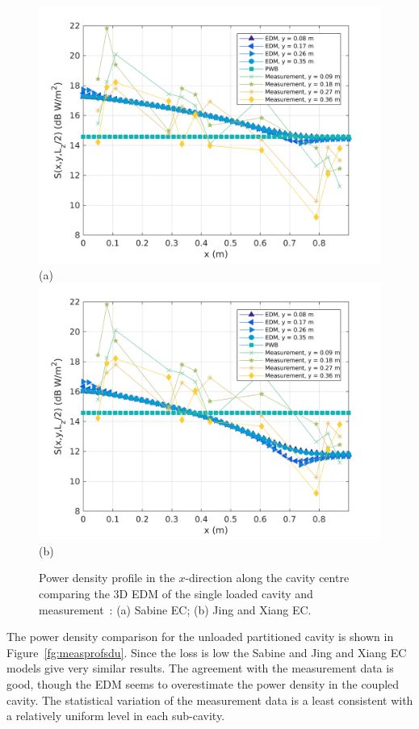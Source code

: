 \documentclass[a4paper]{article}
\numberwithin{equation}{section}
\newcounter{Figure}
\begin{document}
\begin{figure}[hp]
\begin{center}
\includegraphics[width=0.6\linewidth]{figures/SDM_3D_SL_PowerDensityProfileXMeas}\\
{\footnotesize (a)}\\
\vspace{2mm}
\includegraphics[width=0.6\linewidth]{figures/SDM_3D_SL_PowerDensityProfileXMeas_JX}\\
{\footnotesize (b)}\\
\vspace{-2mm}
\caption{\label{fg:measprofssl} Power density profile in the $x$-direction along the cavity centre comparing
the 3D EDM of the single loaded cavity and measurement~\citep{Flintoft2017b}: (a) Sabine EC; (b) Jing and Xiang EC.}
\end{center}
\end{figure}

The power density comparison for the unloaded partitioned cavity is shown in Figure~\ref{fg:measprofsdu}.
Since the loss is low the Sabine and Jing and Xiang EC models give very similar results. The agreement with
the measurement data is good, though the EDM seems to overestimate the power density in the coupled cavity.
The statistical variation of the measurement data is a least consistent with a relatively uniform level in
each sub-cavity.
\end{document}
